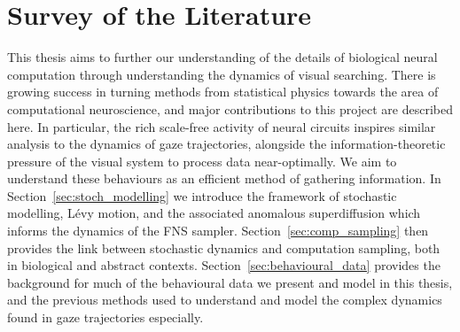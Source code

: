 \chapter{Survey of the Literature}

This thesis aims to further our understanding of the details of biological neural computation through understanding the dynamics of visual searching. There is growing success in turning methods from statistical physics towards the area of computational neuroscience, and major contributions to this project are described here. In particular, the rich scale-free activity of neural circuits inspires similar analysis to the dynamics of gaze trajectories, alongside the information-theoretic pressure of the visual system to process data near-optimally. We aim to understand these behaviours as an efficient method of gathering information. In Section~\ref{sec:stoch_modelling} we introduce the framework of stochastic modelling, Lévy motion, and the associated anomalous superdiffusion which informs the dynamics of the FNS sampler. Section~\ref{sec:comp_sampling} then provides the link between stochastic dynamics and computation sampling, both in biological and abstract contexts. Section~\ref{sec:behavioural_data} provides the background for much of the behavioural data we present and model in this thesis, and the previous methods used to understand and model the complex dynamics found in gaze trajectories especially.






